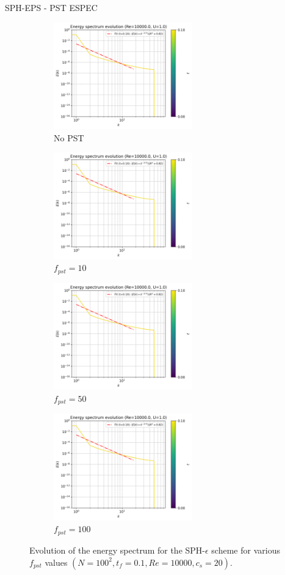 SPH-EPS - PST ESPEC 
\begin{figure}[H]
  \begin{subfigure}{7cm}
  \centering\includegraphics[width=6cm]{Code-Figures/mon2017/pst/c0_20_tait_pec_dtmul_1_nx_100_pst_-1_re_10000_mon2017/energy_spectrum_evolution.png}
  \caption{No PST}
  \end{subfigure}
  \begin{subfigure}{7cm}
  \centering\includegraphics[width=6cm]{Code-Figures/mon2017/pst/c0_20_tait_pec_dtmul_1_nx_100_pst_10_re_10000_mon2017/energy_spectrum_evolution.png}
  \caption{$f_{pst} = 10$}
  \end{subfigure}
  \begin{subfigure}{7cm}
  \centering\includegraphics[width=6cm]{Code-Figures/mon2017/pst/c0_20_tait_pec_dtmul_1_nx_100_pst_50_re_10000_mon2017/energy_spectrum_evolution.png}
  \caption{$f_{pst} = 50$}
  \end{subfigure}
  \begin{subfigure}{7cm}
  \centering\includegraphics[width=6cm]{Code-Figures/mon2017/pst/c0_20_tait_pec_dtmul_1_nx_100_pst_100_re_10000_mon2017/energy_spectrum_evolution.png}
  \caption{$f_{pst} = 100$}
  \end{subfigure}
  \caption{Evolution of the energy spectrum for the SPH-$\epsilon$ scheme for various $f_{pst}$ values $(N=100^2, t_f=0.1, Re=10000, c_s=20)$.}
  \label{fig:sph-eps-pst-espec}
\end{figure}
